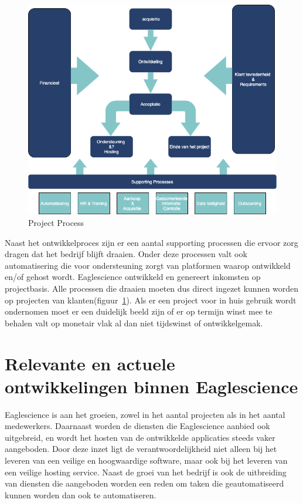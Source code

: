 \begin{figure}[bth]
\myfloatalign
\includegraphics[width=12cm]{gfx/ProcessFlow}
\caption{Project Process}
\label{fig:Project Process}
\end{figure}

Naast het ontwikkelproces zijn er een aantal supporting processen die ervoor zorg dragen dat het bedrijf blijft draaien. Onder deze processen valt ook automatisering die voor ondersteuning zorgt van platformen waarop ontwikkeld en/of gehost wordt. Eaglescience ontwikkeld en genereert inkomsten op projectbasis. Alle processen die draaien moeten dus direct ingezet kunnen worden op projecten van klanten(figuur~\ref{fig:Project Process}). Als er een project voor in huis gebruik wordt ondernomen moet er een duidelijk beeld zijn of er op termijn winst mee te behalen valt op monetair vlak al dan niet tijdswinst of ontwikkelgemak.

\section{Relevante en actuele ontwikkelingen binnen Eaglescience}\label{sec:relevante-en-actuele-ontwikkelingen-binnen-Eaglescience}

Eaglescience is aan het groeien, zowel in het aantal projecten als in het aantal medewerkers. Daarnaast worden de diensten die Eaglescience aanbied ook uitgebreid, en wordt het hosten van de ontwikkelde applicaties steeds vaker aangeboden. Door deze inzet ligt de verantwoordelijkheid niet alleen bij het leveren van een veilige en hoogwaardige software, maar ook bij het leveren van een veilige hosting service. Naast de groei van het bedrijf is ook de uitbreiding van diensten die aangeboden worden een reden om taken die geautomatiseerd kunnen worden dan ook te automatiseren.

